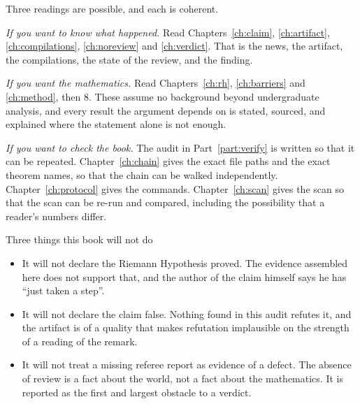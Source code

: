 Three readings are possible, and each is coherent.

\emph{If you want to know what happened.} Read Chapters~\ref{ch:claim}, \ref{ch:artifact}, \ref{ch:compilations}, \ref{ch:noreview} and \ref{ch:verdict}.
That is the news, the artifact, the compilations, the state of the review, and
the finding.

\emph{If you want the mathematics.} Read Chapters~\ref{ch:rh}, \ref{ch:barriers} and \ref{ch:method}, then 8. These
assume no background beyond undergraduate analysis, and every result the
argument depends on is stated, sourced, and explained where the statement alone
is not enough.

\emph{If you want to check the book.} The audit in Part~\ref{part:verify} is written so that
it can be repeated. Chapter~\ref{ch:chain} gives the exact file paths and the exact theorem
names, so that the chain can be walked independently. Chapter~\ref{ch:protocol} gives the
commands. Chapter~\ref{ch:scan} gives the scan so that the scan can be re-run and compared,
including the possibility that a reader's numbers differ.

\begin{mythbox}{Three things this book will not do}
\begin{itemize}
\item It will not declare the Riemann Hypothesis proved. The evidence assembled
here does not support that, and the author of the claim himself says he has
``just taken a step''.
\item It will not declare the claim false. Nothing found in this audit refutes
it, and the artifact is of a quality that makes refutation implausible on the
strength of a reading of the remark.
\item It will not treat a missing referee report as evidence of a defect. The
absence of review is a fact about the world, not a fact about the mathematics.
It is reported as the first and largest obstacle to a verdict.
\end{itemize}
\end{mythbox}

\vspace{8pt}
